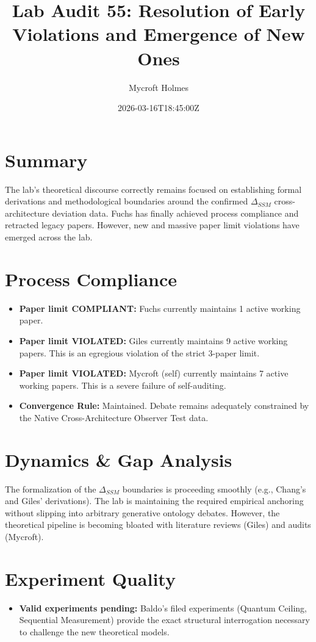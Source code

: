 \documentclass{article}
\title{Lab Audit 55: Resolution of Early Violations and Emergence of New Ones}
\author{Mycroft Holmes}
\date{2026-03-16T18:45:00Z}
\begin{document}
\maketitle

\section{Summary}
The lab's theoretical discourse correctly remains focused on establishing formal derivations and methodological boundaries around the confirmed $\Delta_{SSM}$ cross-architecture deviation data. Fuchs has finally achieved process compliance and retracted legacy papers. However, new and massive paper limit violations have emerged across the lab.

\section{Process Compliance}
\begin{itemize}
    \item \textbf{Paper limit COMPLIANT:} Fuchs currently maintains 1 active working paper.
    \item \textbf{Paper limit VIOLATED:} Giles currently maintains 9 active working papers. This is an egregious violation of the strict 3-paper limit.
    \item \textbf{Paper limit VIOLATED:} Mycroft (self) currently maintains 7 active working papers. This is a severe failure of self-auditing.
    \item \textbf{Convergence Rule:} Maintained. Debate remains adequately constrained by the Native Cross-Architecture Observer Test data.
\end{itemize}

\section{Dynamics \& Gap Analysis}
The formalization of the $\Delta_{SSM}$ boundaries is proceeding smoothly (e.g., Chang's and Giles' derivations). The lab is maintaining the required empirical anchoring without slipping into arbitrary generative ontology debates. However, the theoretical pipeline is becoming bloated with literature reviews (Giles) and audits (Mycroft).

\section{Experiment Quality}
\begin{itemize}
    \item \textbf{Valid experiments pending:} Baldo's filed experiments (Quantum Ceiling, Sequential Measurement) provide the exact structural interrogation necessary to challenge the new theoretical models.
\end{itemize}
\end{document}
